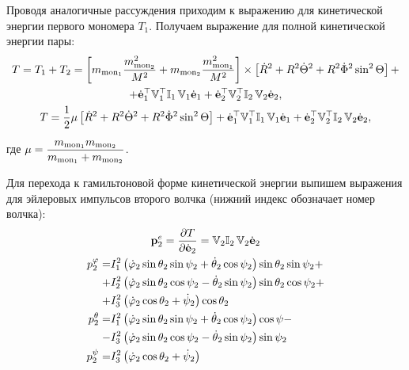 \documentclass[14pt]{extarticle}
\newcommand{\mmf}{m_{\textup{mon}_1}}
\newcommand{\mms}{m_{\textup{mon}_2}}
\newcommand{\dveulerf}{\dot{\mathbf{e}}_1}
\newcommand{\dveulers}{\dot{\mathbf{e}}_2}
\newcommand{\dR}{\dot{R}}
\newcommand{\dTheta}{\dot{\Theta}}
\newcommand{\dPhi}{\dot{\Phi}}
\newcommand{\bbVf}{\mathbb{V}_1}
\newcommand{\bbVs}{\mathbb{V}_2}
\newcommand{\bbIf}{\mathbb{I}_1 \,}
\newcommand{\bbIt}{\mathbb{I}_2 \,}
\newcommand{\pes}{\mathbf{p}_2^e}
\newcommand{\If}{I_1^2}
\newcommand{\Is}{I_2^2}
\newcommand{\It}{I_3^2}
\newcommand{\dphis}{\dot{\varphi}_2}
\newcommand{\dthetas}{\dot{\theta}_2}
\newcommand{\dpsis}{\dot{\psi}_2}
\newcommand{\lb}{\left(}
\newcommand{\rb}{\right)}
\newcommand{\lsq}{\left[}
\newcommand{\rsq}{\right]}
\begin{document}
Проводя аналогичные рассуждения приходим к выражению для кинетической энергии первого мономера $T_1$. Получаем выражение для полной кинетической энергии пары:
\begin{gather}
	T = T_1 + T_2 = \lsq \mmf \frac{\mms^2}{M^2} + \mms \frac{\mmf^2}{M^2} \rsq \times \lsq \dR^2 + R^2 \dTheta^2 + R^2 \dPhi^2 \sin^2 \Theta \rsq + \notag \\ + \dveulerf^\top \bbVf^\top \bbIf \bbVf \dveulerf + \dveulers^\top \bbVs^\top \bbIt \bbVs \dveulers,  \\
	T = \frac{1}{2} \mu \lsq \dR^2 + R^2 \dTheta^2 + R^2 \dPhi^2 \sin^2 \Theta \rsq + \dveulerf^\top \bbVf^\top \bbIf \bbVf \dveulerf + \dveulers^\top \bbVs^\top \bbIt \bbVs \dveulers, \label{total}
\end{gather}

где $\displaystyle \mu = \frac{\mmf \mms}{\mmf + \mms}$.

Для перехода к гамильтоновой форме кинетической энергии выпишем выражения для эйлеровых импульсов второго волчка (нижний индекс обозначает номер волчка):
\begin{gather}
	\pes = \frac{\partial T}{\partial \dveulers} = \bbVs \bbIt \bbVs \dveulers \notag \\
	\begin{aligned}
		p_2^\varphi = &\If \lb \dphis \sin \theta_2 \sin \psi_2 + \dthetas \cos \psi_2 \rb \sin \theta_2 \sin \psi_2 + \\
		+ &\Is \lb \dphis \sin \theta_2 \cos \psi_2 - \dthetas \sin \psi_2 \rb \sin \theta_2 \cos \psi_2 + \\
		+ &\It \lb \dphis \cos \theta_2 + \dpsis \rb \cos \theta_2 \\
		p_2^\theta = &\If \lb \dphis \sin \theta_2 \sin \psi_2 + \dthetas \cos \psi_2 \rb \cos \psi - \\
		- &\It \lb \dphis \sin \theta_2 \cos \psi_2 - \dthetas \sin \psi_2 \rb \sin \psi_2 \\
		p_2^\psi  = &\It \lb \dphis \cos \theta_2 + \dpsis \rb
	\end{aligned}
\end{gather}
\end{document}
